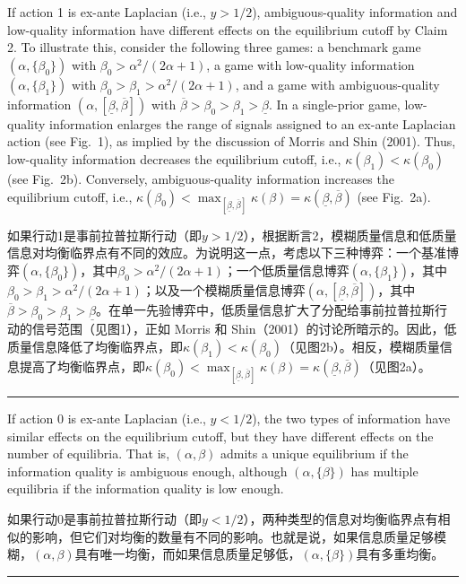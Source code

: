 \documentclass[12pt,a4paper]{article}
\newenvironment{original}
  {\par\medskip\noindent\color{black}\ignorespaces}
  {\par\medskip}
\newenvironment{translation}
  {\par\noindent\color{darkblue}\ignorespaces}
  {\par\medskip\noindent\hrule\par\medskip}
\theoremstyle{definition}
\theoremstyle{remark}
\begin{document}
\begin{original}
If action 1 is ex-ante Laplacian (i.e., $y > 1/2$), ambiguous-quality information and low-quality information have different effects on the equilibrium cutoff by Claim 2. To illustrate this, consider the following three games: a benchmark game $(\alpha, \{\beta_0\})$ with $\beta_0 > \alpha^2/(2\alpha + 1)$, a game with low-quality information $(\alpha, \{\beta_1\})$ with $\beta_0 > \beta_1 > \alpha^2/(2\alpha + 1)$, and a game with ambiguous-quality information $(\alpha, [\underline{\beta}, \overline{\beta}])$ with $\overline{\beta} > \beta_0 > \beta_1 > \underline{\beta}$. In a single-prior game, low-quality information enlarges the range of signals assigned to an ex-ante Laplacian action (see Fig.\ 1), as implied by the discussion of Morris and Shin (2001). Thus, low-quality information decreases the equilibrium cutoff, i.e., $\kappa(\beta_1) < \kappa(\beta_0)$ (see Fig.\ 2b). Conversely, ambiguous-quality information increases the equilibrium cutoff, i.e., $\kappa(\beta_0) < \max_{[\underline{\beta}, \overline{\beta}]} \kappa(\beta) = \kappa(\underline{\beta}, \overline{\beta})$ (see Fig.\ 2a).
\end{original}
\begin{translation}
如果行动1是事前拉普拉斯行动（即$y > 1/2$），根据断言2，模糊质量信息和低质量信息对均衡临界点有不同的效应。为说明这一点，考虑以下三种博弈：一个基准博弈$(\alpha, \{\beta_0\})$，其中$\beta_0 > \alpha^2/(2\alpha + 1)$；一个低质量信息博弈$(\alpha, \{\beta_1\})$，其中$\beta_0 > \beta_1 > \alpha^2/(2\alpha + 1)$；以及一个模糊质量信息博弈$(\alpha, [\underline{\beta}, \overline{\beta}])$，其中$\overline{\beta} > \beta_0 > \beta_1 > \underline{\beta}$。在单一先验博弈中，低质量信息扩大了分配给事前拉普拉斯行动的信号范围（见图1），正如 Morris 和 Shin（2001）的讨论所暗示的。因此，低质量信息降低了均衡临界点，即$\kappa(\beta_1) < \kappa(\beta_0)$（见图2b）。相反，模糊质量信息提高了均衡临界点，即$\kappa(\beta_0) < \max_{[\underline{\beta}, \overline{\beta}]} \kappa(\beta) = \kappa(\underline{\beta}, \overline{\beta})$（见图2a）。
\end{translation}

\begin{original}
If action 0 is ex-ante Laplacian (i.e., $y < 1/2$), the two types of information have similar effects on the equilibrium cutoff, but they have different effects on the number of equilibria. That is, $(\alpha, \beta)$ admits a unique equilibrium if the information quality is ambiguous enough, although $(\alpha, \{\beta\})$ has multiple equilibria if the information quality is low enough.
\end{original}
\begin{translation}
如果行动0是事前拉普拉斯行动（即$y < 1/2$），两种类型的信息对均衡临界点有相似的影响，但它们对均衡的数量有不同的影响。也就是说，如果信息质量足够模糊，$(\alpha, \beta)$具有唯一均衡，而如果信息质量足够低，$(\alpha, \{\beta\})$具有多重均衡。
\end{translation}
\end{document}
